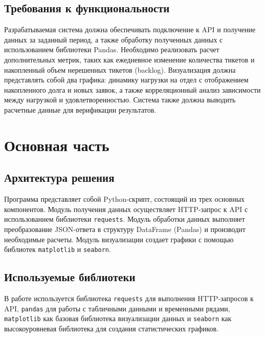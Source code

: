\documentclass{bmstu}
\begin{document}
\section*{Требования к функциональности}

Разрабатываемая система должна обеспечивать подключение к API и получение данных за заданный период, а также обработку полученных данных с использованием библиотеки Pandas. Необходимо реализовать расчет дополнительных метрик, таких как ежедневное изменение количества тикетов и накопленный объем нерешенных тикетов (backlog). Визуализация должна представлять собой два графика: динамику нагрузки на отдел с отображением накопленного долга и новых заявок, а также корреляционный анализ зависимости между нагрузкой и удовлетворенностью. Система также должна выводить расчетные данные для верификации результатов.

\chapter*{Основная часть}

\section*{Архитектура решения}
Программа представляет собой Python-скрипт, состоящий из трех основных компонентов. Модуль получения данных осуществляет HTTP-запрос к API с использованием библиотеки \texttt{requests}. Модуль обработки данных выполняет преобразование JSON-ответа в структуру DataFrame (Pandas) и производит необходимые расчеты. Модуль визуализации создает графики с помощью библиотек \texttt{matplotlib} и \texttt{seaborn}.

\section*{Используемые библиотеки}

В работе используется библиотека \texttt{requests} для выполнения HTTP-запросов к API, \texttt{pandas} для работы с табличными данными и временными рядами, \texttt{matplotlib} как базовая библиотека визуализации данных и \texttt{seaborn} как высокоуровневая библиотека для создания статистических графиков.

\end{document}
